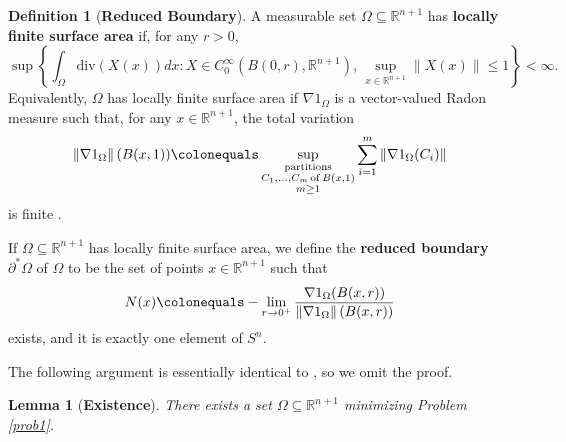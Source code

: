\documentclass[12pt,reqno]{amsart}
\newtheorem{lemma}[theorem]{Lemma}
\theoremstyle{definition}
\newtheorem{definition}[theorem]{Definition}
\renewcommand{\subset}{\subseteq}
\newcommand{\vnormt}[1]{\left\|#1\right\|}    %
\newcommand{\R}{\mathbb{R}}
\newcommand{\embolden}[1]{\textbf {#1}}
\newcommand{\redA}{\partial^{*}\Omega}
\newcommand{\redb}{\partial^{*}}
\newcommand{\sdimn}{n}
\newcommand{\adimn}{n+1}
\begin{document}
\begin{definition}[\embolden{Reduced Boundary}]
A measurable set $\Omega\subset\R^{\adimn}$ has \embolden{locally finite surface area} if, for any $r>0$,
$$\sup\left\{\int_{\Omega}\mathrm{div}(X(x))dx\colon X\in C_{0}^{\infty}(B(0,r),\R^{\adimn}),\, \sup_{x\in\R^{\adimn}}\vnormt{X(x)}\leq1\right\}<\infty.$$
Equivalently, $\Omega$ has locally finite surface area if $\nabla 1_{\Omega}$ is a vector-valued Radon measure such that, for any $x\in\R^{\adimn}$, the total variation
$$
\vnormt{\nabla 1_{\Omega}}(B(x,1))
\colonequals\sup_{\substack{\mathrm{partitions}\\ C_{1},\ldots,C_{m}\,\mathrm{of}\,B(x,1) \\ m\geq1}}\sum_{i=1}^{m}\vnormt{\nabla 1_{\Omega}(C_{i})}
$$
is finite \cite{cicalese12}.

If $\Omega\subset\R^{\adimn}$ has locally finite surface area, we define the \embolden{reduced boundary} $\redA$ of $\Omega$ to be the set of points $x\in\R^{\adimn}$ such that
$$N(x)\colonequals-\lim_{r\to0^{+}}\frac{\nabla 1_{\Omega}(B(x,r))}{\vnormt{\nabla 1_{\Omega}}(B(x,r))}$$
exists, and it is exactly one element of $S^{\sdimn}$.
\end{definition}

The following argument is essentially identical to \cite[Proposition 1]{barchiesi16}, so we omit the proof.

\begin{lemma}[\embolden{Existence}]\label{lemma51p}
There exists a set $\Omega\subset\R^{\adimn}$ minimizing Problem \ref{prob1}.
\end{lemma}
\end{document}
